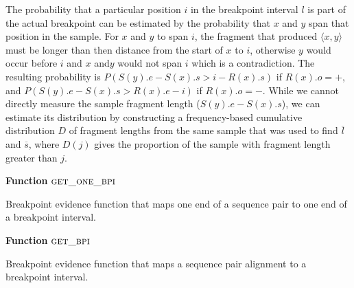 \documentclass[11pt]{article}
\begin{document}
The probability that a particular position $i$ in the breakpoint interval $l$ is
part of the actual breakpoint can be estimated by the probability that $x$ and
$y$ span that position in the sample. For $x$ and $y$ to span $i$, the fragment
that produced $\langle x,y \rangle$ must be longer than then distance from the
start of $x$ to $i$, otherwise $y$ would occur before $i$ and $x$ and$y$ would
not span $i$ which is a contradiction.  The resulting probability is 
$P(S(y).e - S(x).s > i - R(x).s)$ if $R(x).o=+$, and 
$P(S(y).e - S(x).s > R(x).e - i)$ if $R(x).o=-$.
While we cannot directly measure the sample fragment length ($S(y).e - S(x).s$),
we can estimate its distribution by constructing a frequency-based cumulative
distribution $D$ of fragment lengths from the same sample that was used to find
$\overline{l}$ and $\overline{s}$, where $D(j)$ gives the proportion of the
sample with fragment length greater than $j$.

\begin{algorithm}[H]
    \DontPrintSemicolon
    \footnotesize
    \BlankLine
    \textbf{Function} $\textsc{get\_one\_bpi}$\;
	\caption{Breakpoint evidence function that maps one end of a sequence pair
			to one end of a breakpoint interval.}
    \label{get_one_bpi}
\end{algorithm}

\begin{algorithm}[H]
    \DontPrintSemicolon
    \footnotesize
    \BlankLine
    \textbf{Function} $\textsc{get\_bpi}$\;
	\caption{Breakpoint evidence function that maps a sequence pair alignment to
			a breakpoint interval.}
    \label{get_bp}
\end{algorithm}
\end{document}
